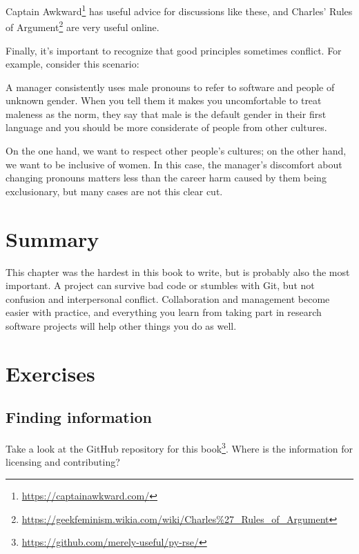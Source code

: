\documentclass[
]{krantz}
\renewenvironment{quote}{\begin{VF}}{\end{VF}}
\renewcommand{\href}[2]{#2\footnote{\url{#1}}}
\begin{document}
\href{https://captainawkward.com/}{Captain Awkward} has useful advice for discussions like these,
and \href{https://geekfeminism.wikia.com/wiki/Charles\%27_Rules_of_Argument}{Charles' Rules of Argument} are very useful online.

Finally,
it's important to recognize that good principles sometimes conflict.
For example,
consider this scenario:

\begin{quote}
A manager consistently uses male pronouns to refer to software and people of unknown gender.
When you tell them it makes you uncomfortable to treat maleness as the norm,
they say that male is the default gender in their first language
and you should be more considerate of people from other cultures.
\end{quote}

On the one hand,
we want to respect other people's cultures;
on the other hand,
we want to be inclusive of women.
In this case,
the manager's discomfort about changing pronouns
matters less than the career harm caused by them being exclusionary,
but many cases are not this clear cut.

\hypertarget{teams-summary}{%
\section{Summary}\label{teams-summary}}

This chapter was the hardest in this book to write,
but is probably also the most important.
A project can survive bad code or stumbles with Git,
but not confusion and interpersonal conflict.
Collaboration and management become easier with practice,
and everything you learn from taking part in research software projects
will help other things you do as well.

\hypertarget{teams-exercises}{%
\section{Exercises}\label{teams-exercises}}

\hypertarget{teams-ex-scavenger-hunt}{%
\subsection{Finding information}\label{teams-ex-scavenger-hunt}}

Take a look at \href{https://github.com/merely-useful/py-rse/}{the GitHub repository for this book}.
Where is the information for licensing and contributing?
\end{document}
